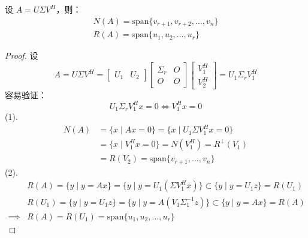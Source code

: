 \begin{theorem}
设 $A=U\Sigma V^H$，则：
\begin{gather*}
    N(A)=\text{span}\{v_{r+1},v_{r+2},\ldots,v_{n}\}\\
    R(A)=\text{span}\{u_1,u_2,\ldots,u_r\}
\end{gather*}
\end{theorem}
\begin{proof}
设
\[
    A=U\Sigma V^H=\begin{bmatrix}U_1&U_2\end{bmatrix}\begin{bmatrix}\Sigma_r&O\\O&O\end{bmatrix}\begin{bmatrix}V_1^H\\V_2^H\end{bmatrix}=U_1\Sigma_rV_1^H
\]
容易验证：
\[
    U_1\Sigma_rV_1^Hx=0\iff V_1^Hx=0
\]
(1).
\begin{align*}
    N(A)&=\{x\mid Ax=0\}=\{x\mid U_1\Sigma V_1^Hx=0\}\\
    &=\{x\mid V_1^Hx=0\}=N(V_1^H)=R^{\perp}(V_1)\\
    &=R(V_2)=\text{span}\{v_{r+1},\ldots,v_n\}
\end{align*}
(2).
\begin{align*}
    &R(A)=\{y\mid y=Ax\}=\{y\mid y=U_1(\Sigma V_1^Hx)\}\subset\{y\mid y=U_1z\}=R(U_1)\\
    &R(U_1)=\{y\mid y=U_1z\}=\{y\mid y=A(V_1\Sigma_1^{-1}z)\}\subset\{y\mid y=Ax\}=R(A)\\
    \implies&R(A)=R(U_1)=\text{span}\{u_1,u_2,\ldots,u_r\}
\end{align*}
\end{proof}


